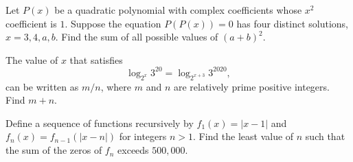 \documentclass[11pt]{article}
\theoremstyle{definition}
\begin{document}
%	














\begin{question}[name={2020 AIME I, \href{https://artofproblemsolving.com/community/c4p14284158}{Problem 14}}]
	Let $P(x)$ be a quadratic polynomial with complex coefficients whose $x^2$ coefficient is $1$. Suppose the equation $P(P(x))=0$ has four distinct solutions, $x=3,4,a,b$. Find the sum of all possible values of $(a+b)^2$.
\end{question}

%
%	
%






\begin{question}[name={2020 AIME II, \href{https://artofproblemsolving.com/community/c4p15681226}{Problem 3}}]
	The value of $x$ that satisfies $$\log_{2^x} 3^{20} = \log_{2^{x+3}} 3^{2020},$$ can be written as ${m}/{n}$, where $m$ and $n$ are relatively prime positive integers. Find $m+n$.	
\end{question}


%	













\begin{question}[name={2020 AIME II, \href{https://artofproblemsolving.com/community/c4p15681098}{Problem 8}}]
	Define a sequence of functions recursively by $f_1(x) = |x-1|$ and $f_n(x)=f_{n-1}(|x-n|)$ for integers $n > 1$. Find the least value of $n$ such that the sum of the zeros of $f_n$ exceeds $500{,}000$.
\end{question}


%	
\end{document}

